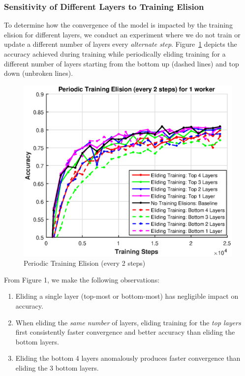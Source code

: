 \subsubsection{Sensitivity of Different Layers to Training Elision}
To determine how the convergence of the model is impacted by the training elision for different layers, we conduct an experiment where we do not train or update a different number of layers every \emph{alternate step}. Figure~\ref{fig:fig1} depicts the accuracy achieved during training while periodically eliding training for a different number of layers starting from the bottom up (dashed lines) and top down (unbroken lines). 
\begin{figure}[t]
	\centering
	\includegraphics[width=0.8\columnwidth]{figures/fig1.eps}
	\caption{Periodic Training Elision (every 2 steps)}
	\label{fig:fig1}
\end{figure}
From Figure 1, we make the following observations: 
\begin{enumerate}
\item Eliding a single layer (top-most or bottom-most) has negligible impact on accuracy.
\item When eliding the \emph{same number} of layers, eliding training for the \emph{top layers} first consistently faster convergence and better accuracy than eliding the bottom layers.
\item Eliding the bottom 4 layers anomalously produces faster convergence than eliding the 3 bottom layers. 
\end{enumerate}
